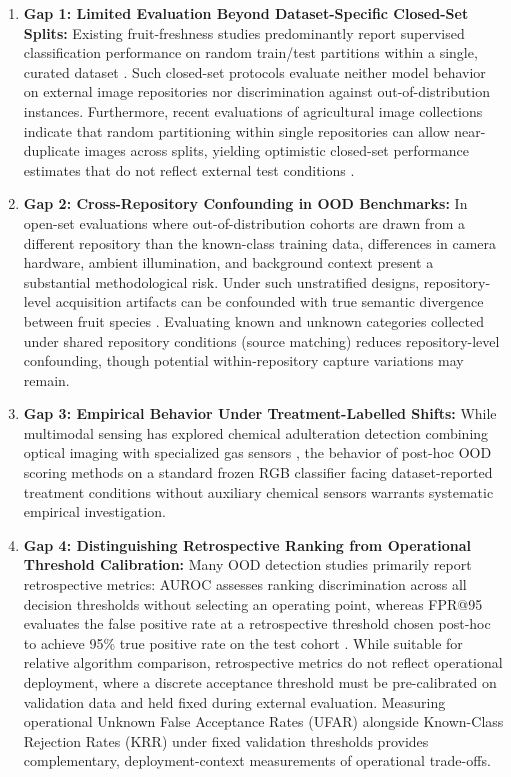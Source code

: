 \begin{enumerate}
\item \textbf{Gap 1: Limited Evaluation Beyond Dataset-Specific Closed-Set Splits:} Existing fruit-freshness studies predominantly report supervised classification performance on random train/test partitions within a single, curated dataset \cite{zhang2024fruit,chen2024classification,gulzar2023fruit}. Such closed-set protocols evaluate neither model behavior on external image repositories nor discrimination against out-of-distribution instances. Furthermore, recent evaluations of agricultural image collections indicate that random partitioning within single repositories can allow near-duplicate images across splits, yielding optimistic closed-set performance estimates that do not reflect external test conditions \cite{abayomi2024fruitq,sultana2022extensive}.
\item \textbf{Gap 2: Cross-Repository Confounding in OOD Benchmarks:} In open-set evaluations where out-of-distribution cohorts are drawn from a different repository than the known-class training data, differences in camera hardware, ambient illumination, and background context present a substantial methodological risk. Under such unstratified designs, repository-level acquisition artifacts can be confounded with true semantic divergence between fruit species \cite{yang2024generalized}. Evaluating known and unknown categories collected under shared repository conditions (source matching) reduces repository-level confounding, though potential within-repository capture variations may remain.
\item \textbf{Gap 3: Empirical Behavior Under Treatment-Labelled Shifts:} While multimodal sensing has explored chemical adulteration detection combining optical imaging with specialized gas sensors \cite{sattar2024sensornet}, the behavior of post-hoc OOD scoring methods on a standard frozen RGB classifier facing dataset-reported treatment conditions \cite{bijoy2025fruitvision} without auxiliary chemical sensors warrants systematic empirical investigation.
\item \textbf{Gap 4: Distinguishing Retrospective Ranking from Operational Threshold Calibration:} Many OOD detection studies primarily report retrospective metrics: AUROC assesses ranking discrimination across all decision thresholds without selecting an operating point, whereas FPR@95 evaluates the false positive rate at a retrospective threshold chosen post-hoc to achieve 95\% true positive rate on the test cohort \cite{hendrycks2017baseline,yang2024generalized,liu2020energy}. While suitable for relative algorithm comparison, retrospective metrics do not reflect operational deployment, where a discrete acceptance threshold must be pre-calibrated on validation data and held fixed during external evaluation. Measuring operational Unknown False Acceptance Rates (UFAR) alongside Known-Class Rejection Rates (KRR) under fixed validation thresholds provides complementary, deployment-context measurements of operational trade-offs.
\end{enumerate}


